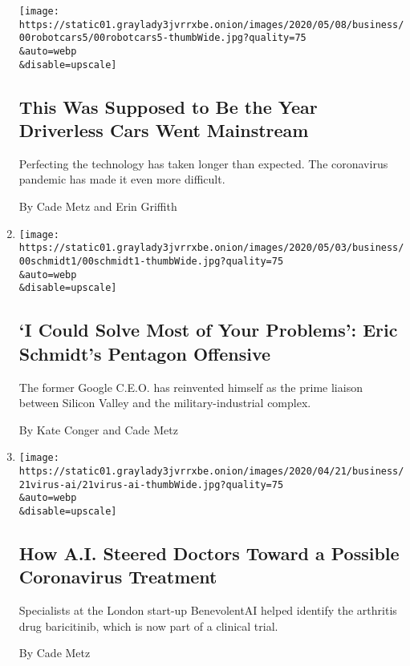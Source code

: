 \begin{enumerate}
  \texttt{[image: https://static01.graylady3jvrrxbe.onion/images/2020/05/08/business/00robotcars5/00robotcars5-thumbWide.jpg?quality=75\\\&auto=webp\\\&disable=upscale]}

  \hypertarget{this-was-supposed-to-be-the-year-driverless-cars-went-mainstream}{%
  \subsection{This Was Supposed to Be the Year Driverless Cars Went
  Mainstream}\label{this-was-supposed-to-be-the-year-driverless-cars-went-mainstream}}

  Perfecting the technology has taken longer than expected. The
  coronavirus pandemic has made it even more difficult.

  By Cade Metz and Erin Griffith
\item
  \href{/2020/05/02/technology/eric-schmidt-pentagon-google.html}{}

  \texttt{[image: https://static01.graylady3jvrrxbe.onion/images/2020/05/03/business/00schmidt1/00schmidt1-thumbWide.jpg?quality=75\\\&auto=webp\\\&disable=upscale]}

  \hypertarget{i-could-solve-most-of-your-problems-eric-schmidts-pentagon-offensive}{%
  \subsection{`I Could Solve Most of Your Problems': Eric Schmidt's
  Pentagon
  Offensive}\label{i-could-solve-most-of-your-problems-eric-schmidts-pentagon-offensive}}

  The former Google C.E.O. has reinvented himself as the prime liaison
  between Silicon Valley and the military-industrial complex.

  By Kate Conger and Cade Metz
\item
  \href{/2020/04/30/technology/coronavirus-treatment-benevolentai-baricitinib.html}{}

  \texttt{[image: https://static01.graylady3jvrrxbe.onion/images/2020/04/21/business/21virus-ai/21virus-ai-thumbWide.jpg?quality=75\\\&auto=webp\\\&disable=upscale]}

  \hypertarget{how-ai-steered-doctors-toward-a-possible-coronavirus-treatment}{%
  \subsection{How A.I. Steered Doctors Toward a Possible Coronavirus
  Treatment}\label{how-ai-steered-doctors-toward-a-possible-coronavirus-treatment}}

  Specialists at the London start-up BenevolentAI helped identify the
  arthritis drug baricitinib, which is now part of a clinical trial.

  By Cade Metz
\end{enumerate}

